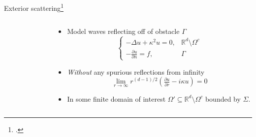 \documentclass{beamer}
\begin{document}
\begin{frame}{Exterior scattering\footcite{Colton_Kress_1998,Kress_1999}}
    \begin{columns}
    \begin{column}{0.45\textwidth}
        \begin{figure}[ht]
        \begin{center}
        \end{center}\label{fig:2ddomain}
        \end{figure}
    \end{column}
    \begin{column}{0.55\textwidth}
        \begin{itemize}
            \item<1-> Model waves reflecting off of obstacle $\Gamma$
            \[
                \begin{cases}
                    -\Delta u + \kappa^2 u = 0, &  \mathbb R^d\setminus\Omega^c \\
                    -\frac{\partial u}{\partial n} = f, & \Gamma
                \end{cases}
            \]
            \item<2-> \emph{Without} any spurious reflections from infinity
            \[
                \lim_{r\to\infty} r^{(d-1)/2}
                    \left(\tfrac{\partial u}{\partial r} - i\kappa u\right)
                = 0
            \]
            \item<3-> In some finite domain of interest 
            $\Omega'\subseteq \mathbb R^d\setminus\Omega^c$
            bounded by $\Sigma$.
        \end{itemize}
    \end{column}
\end{columns}
\end{frame}
\end{document}
